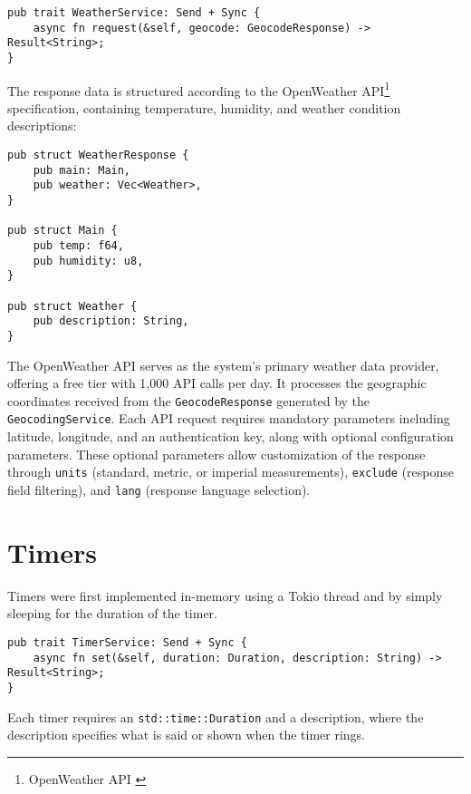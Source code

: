 \begin{verbatim}
pub trait WeatherService: Send + Sync {
    async fn request(&self, geocode: GeocodeResponse) -> Result<String>;
}
\end{verbatim}

The response data is structured according to the OpenWeather API\footnote{OpenWeather API \cite{openweathermap}} specification,
containing temperature, humidity, and weather condition descriptions:

\begin{verbatim}
pub struct WeatherResponse {
    pub main: Main,
    pub weather: Vec<Weather>,
}

pub struct Main {
    pub temp: f64,
    pub humidity: u8,
}

pub struct Weather {
    pub description: String,
}
\end{verbatim}

The OpenWeather API serves as the system's primary weather data provider, offering a free tier with 1,000 API calls per day.
It processes the geographic coordinates received from the \texttt{GeocodeResponse} generated by the \texttt{GeocodingService}.
Each API request requires mandatory parameters including latitude, longitude, and an authentication key, along with optional configuration parameters.
These optional parameters allow customization of the response through \texttt{units} (standard, metric, or imperial measurements),
\texttt{exclude} (response field filtering), and \texttt{lang} (response language selection).

\section{Timers}
Timers were first implemented in-memory using a Tokio thread and by simply sleeping for the duration of the timer.

\begin{verbatim}
pub trait TimerService: Send + Sync {
    async fn set(&self, duration: Duration, description: String) -> Result<String>;
}
\end{verbatim}

Each timer requires an \texttt{std::time::Duration} and a description, where the description specifies what is said or shown when the timer rings.
